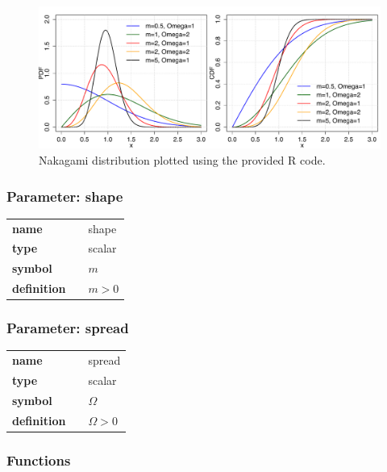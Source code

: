 \documentclass{article}
\begin{document}
\begin{figure}[ht!]
\centering
  \includegraphics[width=140mm]{pics/Nakagami.pdf}
 \caption{Nakagami distribution plotted using the provided R code.}
 \label{fig:Nakagami}
\end{figure}

\subsubsection*{Parameter: shape}

\noindent\begin{tabular}{p{2cm}cl}
\textbf{name} & & shape \\
\textbf{type} & & scalar \\
\textbf{symbol} & & $m$  \\
\textbf{definition} & & $m > 0$
\end{tabular}
\subsubsection*{Parameter: spread}

\noindent\begin{tabular}{p{2cm}cl}
\textbf{name} & & spread \\
\textbf{type} & & scalar \\
\textbf{symbol} & & $\Omega$  \\
\textbf{definition} & & $ \Omega > 0$
\end{tabular}
\subsubsection*{Functions}
\end{document}
